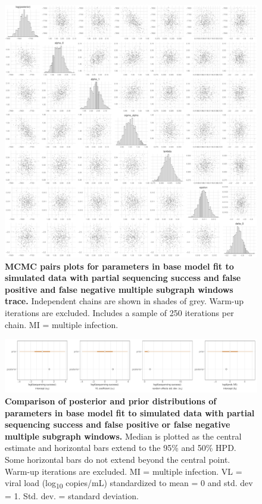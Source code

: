 \documentclass[10pt,letterpaper]{article}
\begin{document}
\begin{figure}[!ht]
 \includegraphics[width=1\textwidth]{../../figures/full_simulation_full_pairs.pdf}
\caption{{\bf MCMC pairs plots for parameters in base model fit to simulated data with partial sequencing success and false positive and false negative multiple subgraph windows trace.} Independent chains are shown in shades of grey. Warm-up iterations are excluded. Includes a sample of 250 iterations per chain. MI = multiple infection.}
\end{figure}

\begin{figure}[!ht]
 \includegraphics[width=1\textwidth]{../../figures/full_simulation_base_prior.pdf}
\caption{{\bf Comparison of posterior and prior distributions of parameters in base model fit to simulated data with partial sequencing success and false positive or false negative multiple subgraph windows.} Median is plotted as the central estimate and horizontal bars extend to the 95\% and 50\% HPD. Some horizontal bars do not extend beyond the central point. Warm-up iterations are excluded. MI = multiple infection. VL = viral load (log\textsubscript{10} copies/mL) standardized to mean = 0 and std. dev = 1. Std. dev. = standard deviation. }
\end{figure}
\end{document}

